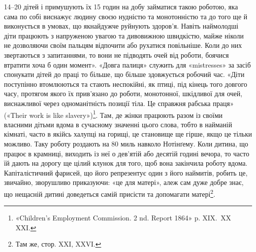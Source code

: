 \parcont{}  %
14--20 дітей і примушують їх 15 годин на добу займатися такою
роботою, яка сама по собі виснажує людину своєю нудністю та
монотонністю та до того ще й виконується в умовах, що якнайдужче
руйнують здоров’я. Навіть наймолодші діти працюють з
напруженою увагою та дивовижною швидкістю, майже ніколи
не дозволяючи своїм пальцям відпочити або рухатися повільніше.
Коли до них звертаються з запитаннями, то вони не підводять очей
від роботи, боячися втратити хоча б один момент». «Довга палиця»
служить для «mistresses» за засіб спонукати дітей до праці то
більше, що більше здовжується робочий час. «Діти поступінно
втомлюються та стають неспокійні, як птиці, під кінець того довгого
часу, протягом якого їх прив’язано до роботи, монотонної, шкідливої
для очей, виснажливої через одноманітність позиції тіла.
Це справжня рабська праця» («Their work is like slavery»)\footnote{
«Children’s Employment Commission. 2 nd. Report 1864» p. XIX.~XX XXI.
}.
Там, де жінки працюють разом із своїми власними дітьми вдома
в сучасному значенні цього слова, тобто в найманій кімнаті,
часто в якійсь халупці на горищі, це становище ще гірше, якщо
це тільки можливо. Таку роботу роздають на 80 миль навколо
Нотінґему. Коли дитина, що працює в крамниці, виходить із неї
о дев’ятій або десятій годині вечора, то часто їй дають на дорогу
ще цілий клунок для того, щоб вона закінчила роботу вдома.
Капіталістичний фарисей, що його репрезентує один з його наймитів,
робить це, звичайно, зворушливо приказуючи: «це для
матері», алеж сам дуже добре знає, що нещасній дитині доведеться
самій присісти та допомагати матері\footnote{
Там же, стор. XXI, XXVI.
}.

